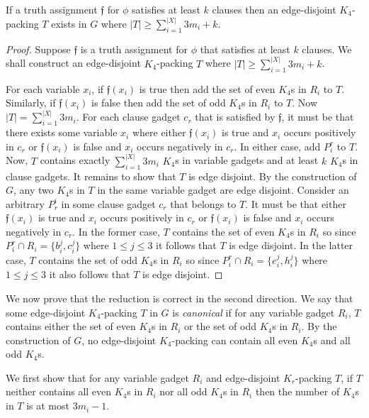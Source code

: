 \begin{lem}
\label{lem:krpacking_kfourpacking_firstdirection}
If a truth assignment $\mathfrak{f}$ for $\phi$ satisfies at least $k$ clauses then an edge-disjoint $K_4$-packing $T$ exists in $G$ where $|T| \geq \sum_{i=1}^{|X|} 3 m_i + k$.
\end{lem}
\begin{proof}
Suppose $\mathfrak{f}$ is a truth assignment for $\phi$ that satisfies at least $k$ clauses. We shall construct an edge-disjoint $K_4$-packing $T$ where $|T| \geq \sum_{i=1}^{|X|} 3 m_i + k$.

For each variable $x_i$, if $\mathfrak{f}(x_i)$ is true then add the set of even $K_4$s in $R_i$ to $T$. Similarly, if $\mathfrak{f}(x_i)$ is false then add the set of odd $K_4$s in $R_i$ to $T$. Now $|T|=\sum_{i=1}^{|X|} 3 m_i$.
For each clause gadget $c_r$ that is satisfied by $\mathfrak{f}$, it must be that there exists some variable $x_i$ where either $\mathfrak{f}(x_i)$ is true and $x_i$ occurs positively in $c_r$ or $\mathfrak{f}(x_i)$ is false and $x_i$ occurs negatively in $c_r$. In either case, add $P_i^r$ to $T$. Now, $T$ contains exactly $\sum_{i=1}^{|X|} 3m_i$ $K_4$s in variable gadgets and at least $k$ $K_4$s in clause gadgets.
It remains to show that $T$ is edge disjoint. By the construction of $G$, any two $K_4$s in $T$ in the same variable gadget are edge disjoint. Consider an arbitrary $P_r^i$ in some clause gadget $c_r$ that belongs to $T$. It must be that either $\mathfrak{f}(x_i)$ is true and $x_i$ occurs positively in $c_r$ or $\mathfrak{f}(x_i)$ is false and $x_i$ occurs negatively in $c_r$. In the former case, $T$ contains the set of even $K_4$s in $R_i$ so since $P_i^r \cap R_i = \{ b_i^j, c_i^j \}$ where $1\leq j\leq 3$ it follows that $T$ is edge disjoint. In the latter case, $T$ contains the set of odd $K_4$s in $R_i$ so since $P_i^r \cap R_i = \{ e_i^j, h_i^j \}$ where $1\leq j\leq 3$ it also follows that $T$ is edge disjoint.
\end{proof}

We now prove that the reduction is correct in the second direction. We say that some edge-disjoint $K_4$-packing $T$ in $G$ is \emph{canonical} if for any variable gadget $R_i$, $T$ contains either the set of even $K_4$s in $R_i$ or the set of odd $K_4$s in $R_i$. By the construction of $G$, no edge-disjoint $K_4$-packing can contain all even $K_4$s and all odd $K_4$s.

We first show that for any variable gadget $R_i$ and edge-disjoint $K_r$-packing $T$, if $T$ neither contains all even $K_4$s in $R_i$ nor all odd $K_4$s in $R_i$ then the number of $K_4$s in $T$ is at most $3 m_i - 1$.

